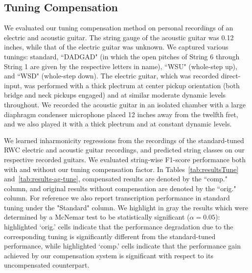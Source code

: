 \documentclass[convention,peer-reviewed]{aesconf}
\begin{document}
\subsection{Tuning Compensation}
We evaluated our tuning compensation method on personal recordings of an electric and acoustic guitar. The string gauge of the acoustic guitar was 0.12 inches, while that of the electric guitar was unknown. We captured various tunings: standard, ``DADGAD" (in which the open pitches of String 6 through String 1 are given by the respective letters in name), ``WSU" (whole-step up), and ``WSD" (whole-step down). The electric guitar, which was recorded direct-input, was performed with a thick plectrum at center pickup orientation (both bridge and neck pickups engaged) and at similar moderate dynamic levels throughout. We recorded the acoustic guitar in an isolated chamber with a large diaphragm condenser microphone placed 12 inches away from the twelfth fret, and we also played it with a thick plectrum and at constant dynamic levels.

We learned inharmonicity regressions from the recordings of the standard-tuned RWC electric and acoustic guitar recordings, and predicted string classes on our respective recorded guitars. We evaluated string-wise F1-score performance both with and without our tuning compensation factor. In Tables~\ref{tab:resultsTune} and~\ref{tab:results-ag-tune}, compensated results are denoted by the ``comp." column, and original results without compensation are denoted by the ``orig." column.  For reference we also report transcription performance in standard tuning under the "Standard" column. We highlight in gray the results which were determined by a McNemar test to be statistically significant ($\alpha = 0.05$): highlighted `orig.' cells indicate that the performance degradation due to the corresponding tuning is significantly different from the standard-tuned performance, while highlighted `comp.' cells indicate that the performance gain achieved by our compensation system is significant with respect to its uncompensated counterpart.
\end{document}
